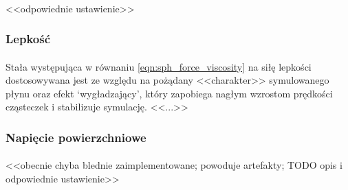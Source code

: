 \paragraph{}
<<odpowiednie ustawienie>>
\par

\subsubsection{Lepkość}

\paragraph{}
Stała występująca w równaniu \eqref{eqn:sph_force_viscosity} na siłę lepkości dostosowywana jest ze względu na pożądany <<charakter>> symulowanego płynu oraz efekt `wygładzający', który zapobiega nagłym wzrostom prędkości cząsteczek i stabilizuje symulację. <<...>>
\par

\subsubsection{Napięcie powierzchniowe}

\paragraph{}
<<obecnie chyba blednie zaimplementowane; powoduje artefakty; TODO opis i odpowiednie ustawienie>>
\par